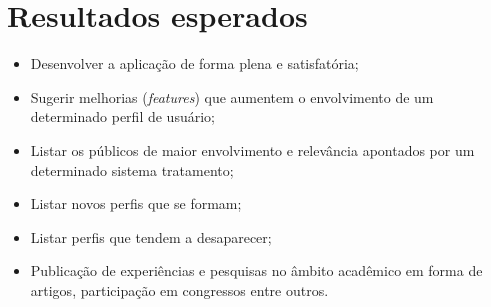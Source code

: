\documentclass[12pt]{article}
\begin{document}
\section{Resultados esperados}

\begin{itemize}[label={\checkmark}]
    \item Desenvolver a aplicação de forma plena e satisfatória;
    \item Sugerir melhorias (\textit{features}) que aumentem o envolvimento de um determinado perfil de usuário;
    \item Listar os públicos de maior envolvimento e relevância apontados por um determinado sistema tratamento;
    \item Listar novos perfis que se formam;
    \item Listar perfis que tendem a desaparecer;
    \item Publicação de experiências e pesquisas no âmbito acadêmico em forma de artigos, participação em congressos entre outros.
\end{itemize}



\end{document}
